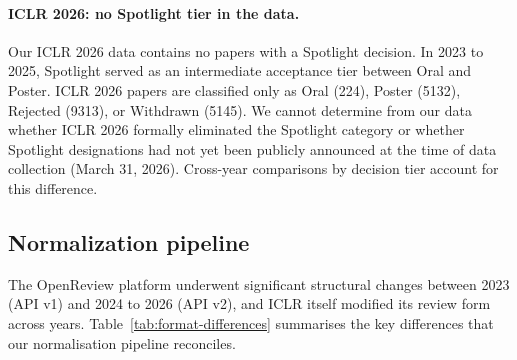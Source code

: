 \documentclass{article}
\begin{document}
\paragraph{ICLR 2026: no Spotlight tier in the data.}
Our ICLR 2026 data contains no papers with a Spotlight decision. In 2023 to 2025, Spotlight served as an intermediate acceptance tier between Oral and Poster. ICLR 2026 papers are classified only as Oral (\num{224}), Poster (\num{5132}), Rejected (\num{9313}), or Withdrawn (\num{5145}). We cannot determine from our data whether ICLR 2026 formally eliminated the Spotlight category or whether Spotlight designations had not yet been publicly announced at the time of data collection (March 31, 2026). Cross-year comparisons by decision tier account for this difference.

\subsection{Normalization pipeline}\label{app:normalization}

The OpenReview platform underwent significant structural changes between 2023 (API v1) and 2024 to 2026 (API v2), and ICLR itself modified its review form across years. Table~\ref{tab:format-differences} summarises the key differences that our normalisation pipeline reconciles.
\end{document}
